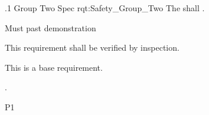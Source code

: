 \ONERQMTV
{\RqtNumberBase.1}
{Group Two Spec}
{rqt:Safety_Group_Two}
{The \ThisSys{} shall \TBD.}
{
	\item [Phase 1] Must past demonstration
}
{This requirement shall be verified by inspection.}
{
\item [N/A] This is a base requirement.
}
{
	\item \TBD.
}
{P1}
